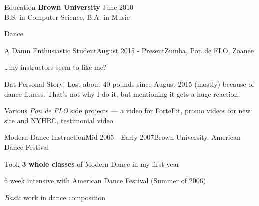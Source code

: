 \documentclass{resume} %
\begin{document}
\begin{rSection}{Education}
{\bf Brown University} \hfill {June 2010} \\ 
B.S. in Computer Science, B.A. in Music
\end{rSection}

\begin{rSection}{Dance}

\begin{rSubsection}{A Damn Enthusiastic Student}{August 2015 - Present}{}{Zumba, Pon de FLO, Zoanee}
\item \ldots{}my instructors seem to like me?
\item Dat Personal Story! Lost about 40 pounds since August 2015 (mostly) because of dance fitness. That's not why I do it, but mentioning it gets a huge reaction.
\item Various \emph{Pon de FLO} side projects --- a video for ForteFit, promo videos for new site and NYHRC, testimonial video
\end{rSubsection}
\begin{rSubsection}{Modern Dance Instruction}{Mid 2005 - Early 2007}{}{Brown University, American Dance Festival}
\item Took \textbf{3 whole classes} of Modern Dance in my first year
\item 6 week intensive with American Dance Festival (Summer of 2006)
\item \emph{Basic} work in dance composition
\end{rSubsection}
\end{rSection}
\end{document}
